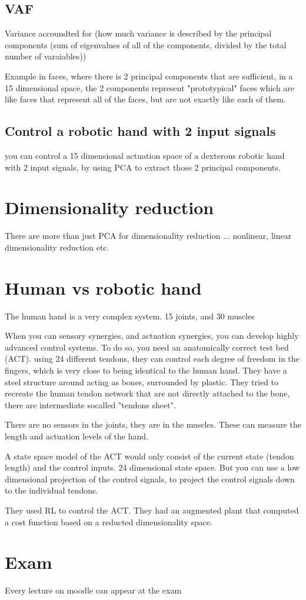 \documentclass[a4paper]{article}
\begin{document}
\subsection{VAF}
Variance accoundted for (how much variance is described by the principal components (sum of eigenvalues of all of the components, divided by the total number of varaiables))


Example in faces, where there is 2 principal components that are sufficient, in a 15 dimensional space, the 2 components represent "prototypical" faces which are like faces that represent all of the faces, but are not exactly like each of them. 


\subsection{Control a robotic hand with 2 input signals}
you can control a 15 dimensional actuation space of a dexterous robotic hand with 2 input signals, by using PCA to extract those 2 principal components. 

\section{Dimensionality reduction}
There are more than just PCA for dimensionality reduction ... nonlinear, linear dimensionality reduction etc.




\section{Human vs robotic hand}
The human hand is a very complex system. 15 joints, and 30 muscles 

When you can sensory synergies, and actuation synergies, you can develop highly advanced control systems. To do so, you need an anatomically correct test bed (ACT). using 24 different tendons, they can control each degree of freedom in the fingers, which is very close to being identical to the human hand. They have a steel structure around acting as bones, surrounded by plastic. They tried to recreate the human tendon network that are not directly attached to the bone, there are intermediate socalled "tendons sheet". 


There are no sensors in the joints, they are in the muscles. These can measure the length and actuation levels of the hand.


A state space model of the ACT would only consist of the current state (tendon length) and the control inputs. 24 dimensional state space. But you can use a low dimensional projection of the control signals, to project the control signals down to the individual tendons. 


They used RL to control the ACT. They had an augmented plant that computed a cost function based on a reducted dimensionality space.


\section{Exam}
Every lecture on moodle can appear at the exam
\end{document}
